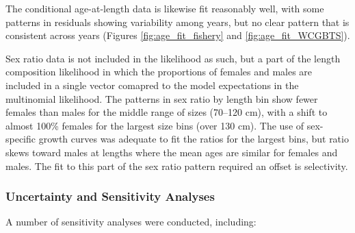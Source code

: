 \documentclass[12pt,]{article}
\begin{document}
The conditional age-at-length data is likewise fit reasonably well, with
some patterns in residuals showing variability among years, but no clear
pattern that is consistent across years (Figures
\ref{fig:age_fit_fishery} and \ref{fig:age_fit_WCGBTS}).

Sex ratio data is not included in the likelihood as such, but a part of
the length composition likelihood in which the proportions of females
and males are included in a single vector comapred to the model
expectations in the multinomial likelihood. The patterns in sex ratio by
length bin show fewer females than males for the middle range of sizes
(70--120 cm), with a shift to almost 100\% females for the largest size
bins (over 130 cm). The use of sex-specific growth curves was adequate
to fit the ratios for the largest bins, but ratio skews toward males at
lengths where the mean ages are similar for females and males. The fit
to this part of the sex ratio pattern required an offset is selectivity.

\hypertarget{uncertainty-and-sensitivity-analyses}{%
\subsubsection{Uncertainty and Sensitivity
Analyses}\label{uncertainty-and-sensitivity-analyses}}

A number of sensitivity analyses were conducted, including:
\end{document}
